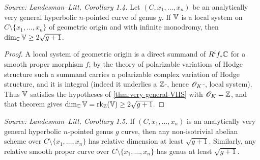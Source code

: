 \begin{corollary}
  \label{cor:geometric-local-systems}
  \textit{Source: Landesman--Litt, Corollary 1.4.}
  Let $(C, x_1, \ldots, x_n)$ be an analytically very general hyperbolic
  $n$-pointed curve of genus $g$. If $\mathbb{V}$ is a local system on
  $C \setminus \{x_1, \ldots, x_n\}$ of geometric origin and with infinite
  monodromy, then $\dim_{\mathbb{C}} \mathbb{V} \ge 2\sqrt{g+1}$.
\end{corollary}

\begin{proof}
  A local system of geometric origin is a direct summand of $R^i f_* \mathbb{C}$ for a
  smooth proper morphism $f$; by the theory of polarizable variations of Hodge
  structure such a summand carries a polarizable complex variation of Hodge
  structure, and it is integral (indeed it underlies a $\mathbb{Z}$-, hence $\mathscr{O}_K$-, local
  system). Thus $\mathbb{V}$ satisfies the hypotheses of \cref{thm:very-general-VHS} with
  $\mathscr{O}_K = \mathbb{Z}$, and that theorem gives
  $\dim_{\mathbb{C}} \mathbb{V} = \operatorname{rk}_{\mathbb{Z}}(\mathbb{V}) \ge 2\sqrt{g+1}$.
\end{proof}

\begin{corollary}
  \label{cor:abelian-schemes}
  \textit{Source: Landesman--Litt, Corollary 1.5.}
  If $(C, x_1, \ldots, x_n)$ is an analytically very general hyperbolic
  $n$-pointed genus $g$ curve, then any non-isotrivial abelian scheme over
  $C \setminus \{x_1, \ldots, x_n\}$ has relative dimension at least
  $\sqrt{g+1}$. Similarly, any relative smooth proper curve over
  $C \setminus \{x_1, \ldots, x_n\}$ has genus at least $\sqrt{g+1}$.
\end{corollary}

